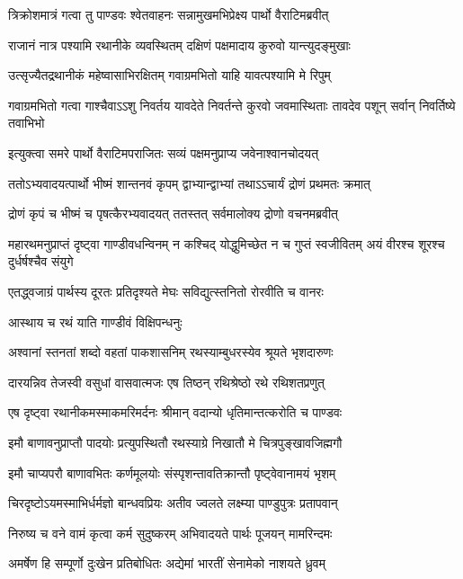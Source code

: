 \twolineshloka
{त्रिक्रोशमात्रं गत्वा तु पाण्डवः श्वेतवाहनः}
{सन्नामुखमभिप्रेक्ष्य पार्थो वैराटिमब्रवीत्}


\twolineshloka
{राजानं नात्र पश्यामि रथानीके व्यवस्थितम्}
{दक्षिणं पक्षमादाय कुरुवो यान्त्युदङ्मुखाः}


\twolineshloka
{उत्सृज्यैतद्रथानीकं महेष्वासाभिरक्षितम्}
{गवाग्रमभितो याहि यावत्पश्यामि मे रिपुम्}


\threelineshloka
{गवाग्रमभितो गत्वा गाश्चैवाऽऽशु निवर्तय}
{यावदेते निवर्तन्ते कुरवो जवमास्थिताः}
{तावदेव पशून् सर्वान् निवर्तिष्ये तवाभिभो}



\twolineshloka
{इत्युक्त्वा समरे पार्थो वैराटिमपराजितः}
{सव्यं पक्षमनुप्राप्य जवेनाश्वानचोदयत्}


\twolineshloka
{ततोऽभ्यवादयत्पार्थो भीष्मं शान्तनवं कृपम्}
{द्वाभ्यान्द्वाभ्यां तथाऽऽचार्यं द्रोणं प्रथमतः क्रमात्}


\twolineshloka
{द्रोणं कृपं च भीष्मं च पृषत्कैरभ्यवादयत्}
{ततस्तत् सर्वमालोक्य द्रोणो वचनमब्रवीत्}


\threelineshloka
{महारथमनुप्राप्तं दृष्ट्वा गाण्डीवधन्विनम्}
{न कश्चिद् योद्धुमिच्छेत न च गुप्तं स्वजीवितम्}
{अयं वीरश्च शूरश्च दुर्धर्षश्चैव संयुगे}


\twolineshloka
{एतद्ध्वजाग्रं पार्थस्य दूरतः प्रतिदृश्यते}
{मेघः सविद्युत्स्तनितो रोरवीति च वानरः}


\onelineshloka
{आस्थाय च रथं याति गाण्डीवं विक्षिपन्धनुः}


\twolineshloka
{अश्वानां स्तनतां शब्दो वहतां पाकशासनिम्}
{रथस्याम्बुधरस्येव श्रूयते भृशदारुणः}


\twolineshloka
{दारयन्निव तेजस्वी वसुधां वासवात्मजः}
{एष तिष्ठन् रथिश्रेष्ठो रथे रथिशतप्रणुत्}


\twolineshloka
{एष दृष्ट्वा रथानीकमस्माकमरिमर्दनः}
{श्रीमान् वदान्यो धृतिमान्तत्करोति च पाण्डवः}


\twolineshloka
{इमौ बाणावनुप्राप्तौ पादयोः प्रत्युपस्थितौ}
{रथस्याग्रे निखातौ मे चित्रपुङ्खावजिह्मगौ}


\twolineshloka
{इमौ चाप्यपरौ बाणावभितः कर्णमूलयोः}
{संस्पृशन्तावतिक्रान्तौ पृष्ट्वेवानामयं भृशम्}


\twolineshloka
{चिरदृष्टोऽयमस्माभिर्धर्मज्ञो बान्धवप्रियः}
{अतीव ज्वलते लक्ष्म्या पाण्डुपुत्रः प्रतापवान्}


\twolineshloka
{निरुष्य च वने वामं कृत्वा कर्म सुदुष्करम्}
{अभिवादयते पार्थः पूजयन् मामरिन्दमः}


\twolineshloka
{अमर्षेण हि सम्पूर्णो दुःखेन प्रतिबोधितः}
{अद्येमां भारतीं सेनामेको नाशयते ध्रुवम्}

